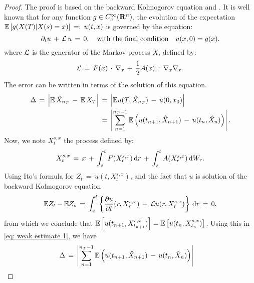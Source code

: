 \begin{proof}
    The proof is based on the backward Kolmogorov equation
    \cite{kloeden1992numerical} and \cite{weinan2005analysis}. It is well known
    that for any function $g \in \test{\real^n}$, the evolution of the
    expectation $\expect \left[g(X(T)| X(s) = x)\right] \,=: \, u(t,x)$ is governed by the equation:
    \begin{equation*}
        \pard{u}{t} \,+\,\op L\,u  \,=\,0,  \quad \text{with the final condition} \quad u(x,0) =
        g(x). 
    \end{equation*}
    where $\op L$ is the generator of the Markov process $X$, defined by:
    \begin{equation*}
            \op L \,=\,F(x) \dotx \grad_x \,+\,\frac{1}{2} A(x)\,:\,\grad_x \grad_x.
    \end{equation*}
    The error can be written in terms of the solution of this equation.
    \begin{equation}
        \begin{aligned}
            \Delta \,=\, \abs{ \expect\, \hat X_{n_T}\,-\,\expect\, X_T } &\,=\, \abs{ \expect u(T,\hat X_{n_T}) \,-\,u(0,x_0) } \\
            &\,=\, \abs{ \sum_{n=1}^{n_T-1}\expect \left( u(t_{n+1}, \hat X_{n+1}) \,-\, u(t_n, \hat X_n) \right)}.
        \end{aligned}
        \label{eq: weak estimate 1}
    \end{equation}
    Now, we note $X_t^{s,x}$ the process defined by:
    \begin{equation*}
        X_t^{s,x} \,=\, x \,+\, \int_s^t F(X_r^{s,x}) \d r \,+\, \int_s^t A(X_r^{s,x})  \d W_r.
    \end{equation*}
    Using Ito's formula for $Z_t \,=\, u(t,X_t^{s,x})$, and the fact that $u$
    is solution of the backward Kolmogorov equation
    \begin{equation*}
        \expect Z_t - \expect Z_s \,=\, \int_s^t \left\{\pardl{u}{t}(r, X_r^{s,x}) \,+\, \op Lu(r, X_r^{s,x}) \right\} \d r \,=\, 0,
    \end{equation*}
    from which we conclude that $\expect \left[u(t_{n+1},
        X_{t_{n+1}}^{s,x})\right] = \expect \left[u(t_n,
        X_{t_n}^{s,x})\right]$. Using this in \cref{eq: weak estimate 1}, we have
    \begin{equation*}
        \begin{aligned}
            \Delta &\,=\, \abs{ \sum_{n=1}^{n_T-1}\expect \left( u(t_{n+1}, \hat
                X_{n+1}) \,-\, u(t_n, \hat X_n) \right)
}
\end{aligned}
\end{equation*}
\end{proof}
